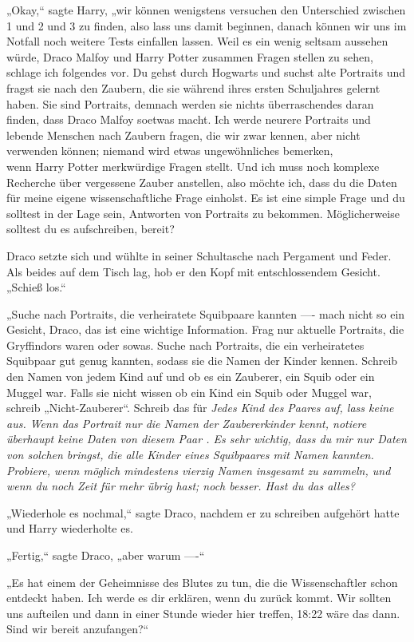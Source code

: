 {„Okay,“ sagte Harry, „wir können wenigstens versuchen den Unterschied zwischen 1 und 2 und 3 zu finden, also lass uns damit beginnen, danach können wir uns im Notfall noch weitere Tests einfallen lassen. Weil es ein wenig seltsam aussehen würde, Draco Malfoy und Harry Potter zusammen Fragen stellen zu sehen, schlage ich folgendes vor. Du gehst durch Hogwarts und suchst alte Portraits und fragst sie nach den Zaubern, die sie während ihres ersten Schuljahres gelernt haben. Sie sind Portraits, demnach werden sie nichts überraschendes daran finden, dass Draco Malfoy soetwas macht. Ich werde neurere Portraits und lebende Menschen nach Zaubern fragen, die wir zwar kennen, aber nicht verwenden können; niemand wird etwas ungewöhnliches bemerken,\\ wenn Harry Potter merkwürdige Fragen stellt. Und ich muss noch komplexe Recherche über vergessene Zauber anstellen, also möchte ich, dass du die Daten für meine eigene wissenschaftliche Frage einholst. Es ist eine simple Frage und du solltest in der Lage sein, Antworten von Portraits zu bekommen. Möglicherweise solltest du es aufschreiben, bereit?

Draco setzte sich und wühlte in seiner Schultasche nach Pergament und Feder. Als beides auf dem Tisch lag, hob er den Kopf mit entschlossendem Gesicht. „Schieß los.“

„Suche nach Portraits, die verheiratete Squibpaare kannten ---- mach nicht so ein Gesicht, Draco, das ist eine wichtige Information. Frag nur aktuelle Portraits, die Gryffindors waren oder sowas. Suche nach Portraits, die ein verheiratetes Squibpaar gut genug kannten, sodass sie die Namen der Kinder kennen. Schreib den Namen von jedem Kind auf und ob es ein Zauberer, ein Squib oder ein Muggel war. Falls sie nicht wissen ob ein Kind ein Squib oder Muggel war, schreib „Nicht-Zauberer“. Schreib das für \emph{Jedes Kind des Paares auf, lass keine aus. Wenn das Portrait nur die Namen der Zaubererkinder kennt, notiere überhaupt keine Daten von diesem Paar . Es sehr wichtig, dass du mir nur Daten von solchen bringst, die \emph{alle} Kinder eines Squibpaares mit Namen kannten. Probiere, wenn möglich mindestens vierzig Namen insgesamt zu sammeln, und wenn du noch Zeit für mehr übrig hast; noch besser. Hast du das alles?}

„Wiederhole es nochmal,“ sagte Draco, nachdem er zu schreiben aufgehört hatte und Harry wiederholte es.

„Fertig,“ sagte Draco, „aber warum ----“

„Es hat einem der Geheimnisse des Blutes zu tun, die die Wissenschaftler schon entdeckt haben. Ich werde es dir erklären, wenn du zurück kommt. Wir sollten uns aufteilen und dann in einer Stunde wieder hier treffen, 18:22 wäre das dann. Sind wir bereit anzufangen?“

}
